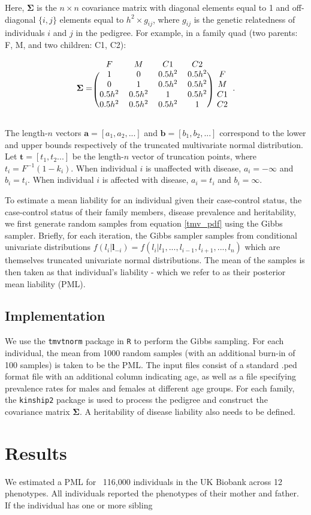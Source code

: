 \documentclass{article}
\begin{document}
\noindent Here, $\boldsymbol{\Sigma}$ is the $n \times n$ covariance matrix with diagonal elements equal to 1 and off-diagonal $\{i,j\}$ elements equal to $h^2 \times g_{ij}$, where $g_{ij}$ is the genetic relatedness of individuals $i$ and $j$ in the pedigree. For example, in a family quad (two parents: F, M, and two children: C1, C2):

\[
\boldsymbol{\Sigma}=\begin{blockarray}{ccccc}
F & M & C1 & C2 \\
\begin{block}{(cccc)c}
 1 & 0 & 0.5h^2 & 0.5h^2 & F \\
 0 & 1 & 0.5h^2 & 0.5h^2 & M \\
 0.5h^2 & 0.5h^2 & 1 & 0.5h^2 & C1 \\
 0.5h^2 & 0.5h^2 & 0.5h^2 & 1 & C2 \\
\end{block}
\end{blockarray}.
 \]

\noindent The length-$n$ vectors $\boldsymbol{a} = [a_1,a_2,...]$ and $\boldsymbol{b} = [b_1,b_2,...]$ correspond to the lower and upper bounds respectively of the truncated multivariate normal distribution. Let $\boldsymbol{t} = [t_1,t_2...]$ be the length-$n$ vector of truncation points, where $t_i = F^{-1}(1-k_i)$. When individual $i$ is unaffected with disease, $a_i = -\infty$ and $b_i = t_i$. When individual $i$ is affected with disease, $a_i = t_i$ and $b_i = \infty$.

To estimate a mean liability for an individual given their case-control status, the case-control status of their family members, disease prevalence and heritability, we first generate random samples from equation \ref{tmv_pdf} using the Gibbs sampler. Briefly, for each iteration, the Gibbs sampler samples from conditional univariate distributions $f(l_i | \boldsymbol{l}_{-i}) = f(l_i | l_1,...,l_{i-1},l_{i+1},...,l_n)$ which are themselves truncated univariate normal distributions. The mean of the samples is then taken as that individual's liability - which we refer to as their posterior mean liability (PML).

\subsection{Implementation}
We use the \texttt{tmvtnorm} package in \texttt{R} to perform the Gibbs sampling. For each individual, the mean from 1000 random samples (with an additional burn-in of 100 samples) is taken to be the PML. The input files consist of a standard .ped format file with an additional column indicating age, as well as a file specifying prevalence rates for males and females at different age groups. For each family, the \texttt{kinship2} package is used to process the pedigree and construct the covariance matrix $\boldsymbol{\Sigma}$. A heritability of disease liability also needs to be defined.

\section{Results}
We estimated a PML for ~116,000 individuals in the UK Biobank across 12 phenotypes. All individuals reported the phenotypes of their mother and father. If the individual has one or more sibling
\end{document}
